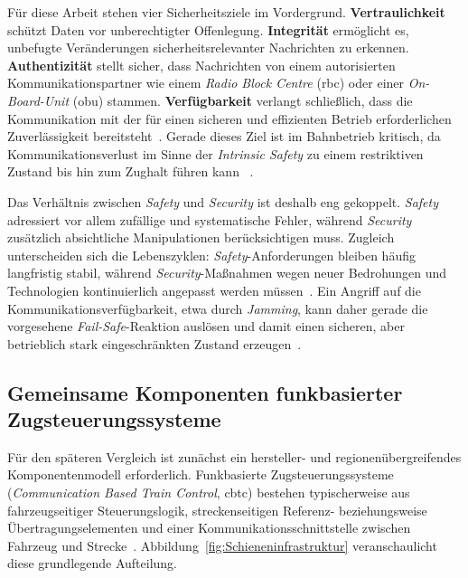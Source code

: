 \documentclass[runningheads]{res/llncs}
\begin{document}
Für diese Arbeit stehen vier Sicherheitsziele im Vordergrund. \textbf{Vertraulichkeit} schützt Daten vor unberechtigter Offenlegung. \textbf{Integrität} ermöglicht es, unbefugte Veränderungen sicherheitsrelevanter Nachrichten zu erkennen. \textbf{Authentizität} stellt sicher, dass Nachrichten von einem autorisierten Kommunikationspartner wie einem \textit{Radio Block Centre} (\gls{rbc}) oder einer \textit{On-Board-Unit} (\gls{obu}) stammen. \textbf{Verfügbarkeit} verlangt schließlich, dass die Kommunikation mit der für einen sicheren und effizienten Betrieb erforderlichen Zuverlässigkeit bereitsteht~\parencite[S. 207]{trinckaufETCS2024}. Gerade dieses Ziel ist im Bahnbetrieb kritisch, da Kommunikationsverlust im Sinne der \textit{Intrinsic Safety} zu einem restriktiven Zustand bis hin zum Zughalt führen kann~\parencite[S. 56]{gaggeroSurvey2024} .

Das Verhältnis zwischen \textit{Safety} und \textit{Security} ist deshalb eng gekoppelt. \textit{Safety} adressiert vor allem zufällige und systematische Fehler, während \textit{Security} zusätzlich absichtliche Manipulationen berücksichtigen muss. Zugleich unterscheiden sich die Lebenszyklen: \textit{Safety}-Anforderungen bleiben häufig langfristig stabil, während \textit{Security}-Maßnahmen wegen neuer Bedrohungen und Technologien kontinuierlich angepasst werden müssen~\parencite[S. 204]{trinckaufETCS2024}. Ein Angriff auf die Kommunikationsverfügbarkeit, etwa durch \textit{Jamming}, kann daher gerade die vorgesehene \textit{Fail-Safe}-Reaktion auslösen und damit einen sicheren, aber betrieblich stark eingeschränkten Zustand erzeugen~\parencite[S. 56--59]{gaggeroSurvey2024}.

\subsection{Gemeinsame Komponenten funkbasierter Zugsteuerungssysteme}
\label{sec:Übersicht_gemeinsamer_Komponenten_funkbasierter_Zugsteuerungssysteme}

Für den späteren Vergleich ist zunächst ein hersteller- und regionenübergreifendes Komponentenmodell erforderlich. Funkbasierte Zugsteuerungssysteme (\textit{Communication Based Train Control}, \gls{cbtc}) bestehen typischerweise aus fahrzeugseitiger Steuerungslogik, streckenseitigen Referenz- beziehungsweise Übertragungselementen und einer Kommunikationsschnittstelle zwischen Fahrzeug und Strecke~\parencite[S. 9--11]{xiangliuCyber2020}. Abbildung~\ref{fig:Schieneninfrastruktur} veranschaulicht diese grundlegende Aufteilung.
\end{document}
